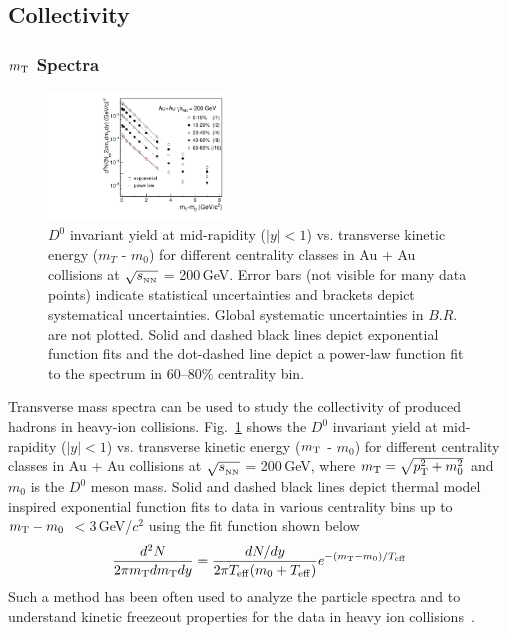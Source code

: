 \documentclass[%
 reprint,	
 amsmath,amssymb,
 aps,
 prc,
]{revtex4-1}
\begin{document}
\subsection{\label{result:collectivity}Collectivity}

\subsubsection{\label{result:collectivity:mT}$m_{\rm T}$ Spectra}

\begin{figure}
\centering
\includegraphics[width=0.43\textwidth]{fig/mTFit_D0.pdf}
\caption{$D^{0}$ invariant yield at mid-rapidity ($|y|<1$) vs. transverse kinetic energy ($m_{T}$ - $m_{0}$) for different centrality classes in Au + Au collisions at $\sqrt{s_{_{\rm NN}}}$ = 200\,GeV. Error bars (not visible for many data points) indicate statistical uncertainties and brackets depict systematical uncertainties. Global systematic uncertainties in $B.R.$ are not plotted. Solid and dashed black lines depict exponential function fits and the dot-dashed line depict a power-law function fit to the spectrum in 60--80\% centrality bin.}
\label{fig:mTFit_D0} 
\end{figure}

Transverse mass spectra can be used to study the collectivity of produced hadrons in heavy-ion collisions. Fig.~\ref{fig:mTFit_D0} shows the $D^{0}$ invariant yield at mid-rapidity ($|y|<1$) vs. transverse kinetic energy ($m_{\rm T}$ - $m_{0}$) for different centrality classes in Au + Au collisions at $\sqrt{s_{_{\rm NN}}}$ = 200\,GeV, where $m_{\rm T} = \sqrt{p_{\rm T}^2+m_0^2}$ and $m_0$ is the $D^0$ meson mass. Solid and dashed black lines depict thermal model inspired exponential function fits to data in various centrality bins up to $m_{\rm T} - m_{0}$ $<3$\,GeV/$c^2$ using the fit function shown below
\[
\frac{d^2N}{2\pi m_{\rm T}dm_{\rm T}dy} = \frac{dN/dy}{2\pi T_{\rm eff}(m_0+T_{\rm eff})}e^{-(m_{\rm T}-m_0)/T_{\rm eff}}
\]
Such a method has been often used to analyze the particle spectra and to understand kinetic freezeout properties for the data in heavy ion collisions~\cite{Kaneta:1999lnf,StarWhitePaper}.
\end{document}

